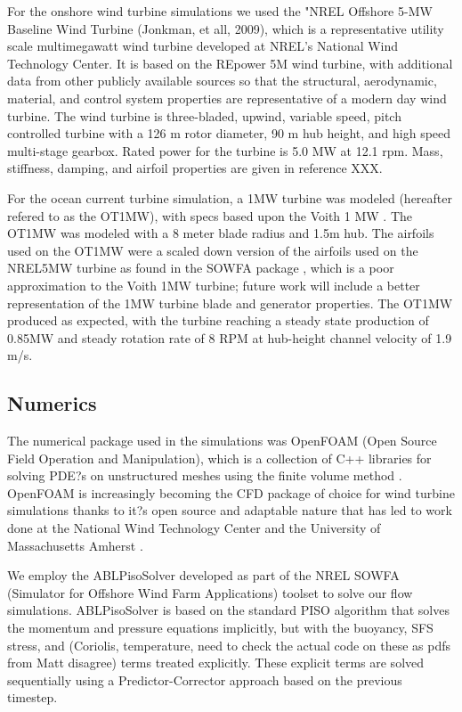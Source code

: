 For the onshore wind turbine simulations we used the "NREL Offshore 5-MW Baseline Wind Turbine (Jonkman, et all, 2009), which is a representative utility scale multimegawatt wind turbine developed at NREL's National Wind Technology Center.  It is based on the REpower 5M wind turbine, with additional data from other publicly available sources so that the structural, aerodynamic, material, and control system properties are representative of a modern day wind turbine.  The wind turbine is three-bladed, upwind, variable speed, pitch controlled turbine with a 126 m rotor diameter, 90 m hub height, and high speed multi-stage gearbox.  Rated power for the turbine is 5.0 MW at 12.1 rpm.  Mass, stiffness, damping, and airfoil properties are given in reference XXX.

For the ocean current turbine simulation, a 1MW turbine was modeled (hereafter refered to as the OT1MW), with specs based upon the Voith 1 MW \cite{Voith}. The OT1MW was modeled with a 8 meter blade radius and 1.5m hub. The airfoils used on the OT1MW were a scaled down version of the airfoils used on the NREL5MW turbine as found in the SOWFA package \cite{SOWFA}, which is a poor approximation to the Voith 1MW turbine; future work will include a better representation of the 1MW turbine blade and generator properties. The OT1MW produced as expected, with the turbine reaching a steady state production of 0.85MW and steady rotation rate of 8 RPM at hub-height channel velocity of 1.9 m/s.



\subsection{Numerics}


The numerical package used in the simulations was OpenFOAM (Open Source Field Operation and Manipulation), which is a collection of C++ libraries for solving PDE?s on unstructured meshes using the finite volume method \cite{OpenFOAM}. OpenFOAM is increasingly becoming the CFD package of choice for wind turbine simulations thanks to it?s open source and adaptable nature that has led to work done at the National Wind Technology Center and the University of Massachusetts Amherst \cite{}.  

We employ the ABLPisoSolver developed as part of the NREL SOWFA (Simulator for Offshore Wind Farm Applications) toolset \cite{Matt and Sang} to solve our flow simulations.  ABLPisoSolver is based on the standard PISO algorithm that solves the momentum and pressure equations implicitly, but with the buoyancy, SFS stress, and (Coriolis, temperature, need to check the actual code on these as pdfs from Matt disagree) terms treated explicitly.  These explicit terms are solved sequentially using a Predictor-Corrector approach based on the previous timestep.  

